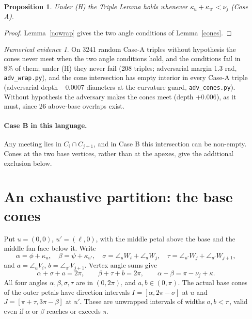 \documentclass[11pt]{article}
\newtheorem{proposition}[lemma]{Proposition}
\theoremstyle{definition}
\theoremstyle{remark}
\newtheorem{numerics}[lemma]{Numerical evidence}
\begin{document}
\begin{proposition}
Under (H) the Triple Lemma holds whenever $\kappa_u+\kappa_{u'}<\nu_j$ (Case A).
\end{proposition}
\begin{proof}
Lemma~\ref{nowrap} gives the two angle conditions of Lemma~\ref{cones}.
\end{proof}

\begin{numerics}
On 3241 random Case-A triples without hypothesis the cones never meet when the two angle conditions hold, and the
conditions fail in 8\% of them; under (H) they never fail (208 triples; adversarial margin $1.3$ rad,
\texttt{adv\_wrap.py}), and the cone intersection has empty interior in every Case-A triple (adversarial depth
$-0.0007$ diameters at the curvature guard, \texttt{adv\_cones.py}). Without hypothesis the adversary makes the cones
meet (depth $+0.006$), as it must, since 26 above-base overlaps exist.
\end{numerics}

\paragraph{Case B in this language.} Any meeting lies in $C_i\cap C_{j+1}$, and in Case B this intersection
can be non-empty. Cones at the two base vertices, rather than at the apexes,
give the additional exclusion below.

\section{An exhaustive partition: the base cones}\label{sec:basecones}

Put $u=(0,0)$, $u'=(\ell,0)$, with the middle petal above the base and the
middle fan face below it. Write
\[
 \alpha=\phi+\kappa_u,\quad \beta=\psi+\kappa_{u'},\quad
 \sigma=\angle_uW_i+\angle_uW_j,\quad
 \tau=\angle_{u'}W_j+\angle_{u'}W_{j+1},
\]
and $a=\angle_uV_i$, $b=\angle_{u'}V_{j+1}$. Vertex angle sums give
\[
 \alpha+\sigma+a=2\pi,\qquad \beta+\tau+b=2\pi,
 \qquad \alpha+\beta=\pi-\nu_j+\kappa.
\]
All four angles $\alpha,\beta,\sigma,\tau$ are in $(0,2\pi)$, and $a,b\in(0,\pi)$.
The actual base cones of the outer petals have direction intervals
$I=[\alpha,2\pi-\sigma]$ at $u$ and
$J=[\pi+\tau,3\pi-\beta]$ at $u'$. These are unwrapped intervals of widths
$a,b<\pi$, valid even if $\alpha$ or $\beta$ reaches or exceeds $\pi$.
\end{document}
